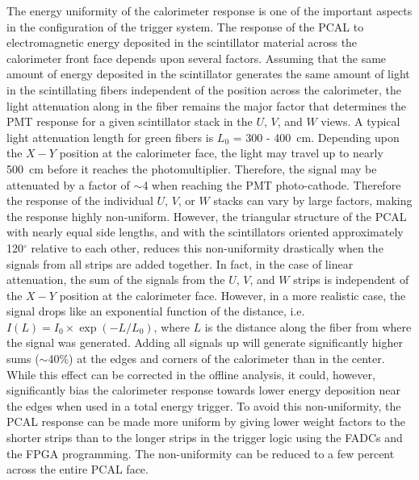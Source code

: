 The energy uniformity of the calorimeter response is one of the important 
aspects in the configuration of the trigger system.  The response of the 
PCAL to electromagnetic energy deposited in the scintillator material across 
the calorimeter front face depends upon several factors.  Assuming that the 
same amount of energy deposited in the scintillator generates the same amount 
of light in the scintillating fibers independent of the position across the
calorimeter, the light attenuation along in the fiber remains the major
factor that determines the PMT response for a given scintillator stack
in the $U$, $V$, and $W$ views.  A typical light attenuation length for 
green fibers is $L_0$ = 300 - 400~cm.  Depending upon the $X-Y$ position at 
the calorimeter face, the light may travel up to nearly 500~cm before it
reaches the photomultiplier.  Therefore, the signal may be attenuated by a 
factor of $\sim$4 when reaching the PMT photo-cathode.  Therefore the
response of the individual $U$, $V$, or $W$ stacks can vary by large factors,
making the response highly non-uniform.  However, the triangular structure of 
the PCAL with nearly equal side lengths, and with the scintillators oriented 
approximately 120$^\circ$ relative to each other, reduces this non-uniformity 
drastically when the signals from all strips are added together.  In fact, in 
the case of linear attenuation, the sum of the signals from the $U$, $V$, and 
$W$ strips is independent of the $X-Y$ position at the calorimeter face. 
However, in a more realistic case, the signal drops like an exponential 
function of the distance, i.e. $I(L) = I_0 \times \exp(-L/L_0)$, where $L$ is 
the distance along the fiber from where the signal was generated.  Adding all 
signals up will generate significantly higher sums ($\sim$40\%) at the
edges and corners of the calorimeter than in the center.  While this effect 
can be corrected in the offline analysis, it could, however, significantly 
bias the calorimeter response towards lower energy deposition near the edges 
when used in a total energy trigger.  To avoid this non-uniformity, the PCAL 
response can be made more uniform by giving lower weight factors to the 
shorter strips than to the longer strips in the trigger logic using the FADCs 
and the FPGA programming.  The non-uniformity can be reduced to a few percent 
across the entire PCAL face.  
